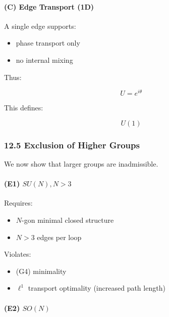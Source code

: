 \documentclass[
]{article}
\providecommand{\tightlist}{%
  \setlength{\itemsep}{0pt}\setlength{\parskip}{0pt}}
\begin{document}
\hypertarget{c-edge-transport-1d}{%
\paragraph{(C) Edge Transport (1D)}\label{c-edge-transport-1d}}

A single edge supports:

\begin{itemize}
\tightlist
\item
  phase transport only
\item
  no internal mixing
\end{itemize}

Thus:

\[
U = e^{i\theta}
\]

This defines:

\[
U(1)
\]

\hypertarget{exclusion-of-higher-groups}{%
\subsubsection{12.5 Exclusion of Higher
Groups}\label{exclusion-of-higher-groups}}

We now show that larger groups are inadmissible.

\hypertarget{e1-sun-n-3}{%
\paragraph{\texorpdfstring{(E1)
\(SU(N), N > 3\)}{(E1) SU(N), N \textgreater{} 3}}\label{e1-sun-n-3}}

Requires:

\begin{itemize}
\tightlist
\item
  \(N\)-gon minimal closed structure
\item
  \(N > 3\) edges per loop
\end{itemize}

Violates:

\begin{itemize}
\tightlist
\item
  (G4) minimality
\item
  \(\ell^1\) transport optimality (increased path length)
\end{itemize}

\hypertarget{e2-son}{%
\paragraph{\texorpdfstring{(E2) \(SO(N)\)}{(E2) SO(N)}}\label{e2-son}}
\end{document}
